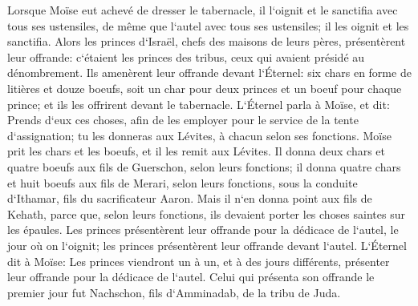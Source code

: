 \verse Lorsque Moïse eut achevé de dresser le tabernacle, il l`oignit et le sanctifia avec tous ses ustensiles, de même que l`autel avec tous ses ustensiles; il les oignit et les sanctifia. 
\verse Alors les princes d`Israël, chefs des maisons de leurs pères, présentèrent leur offrande: c`étaient les princes des tribus, ceux qui avaient présidé au dénombrement. 
\verse Ils amenèrent leur offrande devant l`Éternel: six chars en forme de litières et douze boeufs, soit un char pour deux princes et un boeuf pour chaque prince; et ils les offrirent devant le tabernacle. 
\verse L`Éternel parla à Moïse, et dit: 
\verse Prends d`eux ces choses, afin de les employer pour le service de la tente d`assignation; tu les donneras aux Lévites, à chacun selon ses fonctions. 
\verse Moïse prit les chars et les boeufs, et il les remit aux Lévites. 
\verse Il donna deux chars et quatre boeufs aux fils de Guerschon, selon leurs fonctions; 
\verse il donna quatre chars et huit boeufs aux fils de Merari, selon leurs fonctions, sous la conduite d`Ithamar, fils du sacrificateur Aaron. 
\verse Mais il n`en donna point aux fils de Kehath, parce que, selon leurs fonctions, ils devaient porter les choses saintes sur les épaules. 
\verse Les princes présentèrent leur offrande pour la dédicace de l`autel, le jour où on l`oignit; les princes présentèrent leur offrande devant l`autel. 
\verse L`Éternel dit à Moïse: Les princes viendront un à un, et à des jours différents, présenter leur offrande pour la dédicace de l`autel. 
\verse Celui qui présenta son offrande le premier jour fut Nachschon, fils d`Amminadab, de la tribu de Juda. 
